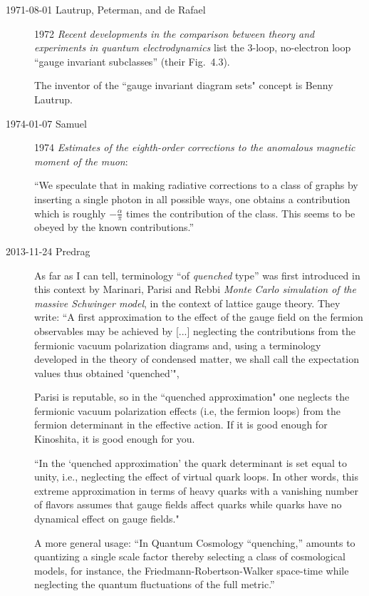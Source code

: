 \begin{description}
\item[1971-08-01 Lautrup, Peterman, and de Rafael]
 1972 {\em Recent
developments in the comparison between theory and experiments in quantum
electrodynamics} list the 3-loop, no-electron loop ``gauge invariant
subclasses'' (their Fig.~4.3).

The inventor of the ``gauge invariant diagram sets" concept is Benny
Lautrup.

\item[1974-01-07 Samuel]
1974 {\em Estimates of the eighth-order corrections
to the anomalous magnetic moment of the muon}:

``We speculate that in making radiative corrections to a class of graphs
by inserting a single photon in all possible ways, one obtains a
contribution which is roughly $-\frac{\alpha}{\pi}$ times the
contribution of the class. This seems to be obeyed by the known
contributions.''

\item[2013-11-24  Predrag]
As far as I can tell, terminology ``of \emph{quenched} type'' was first
introduced in this context by
Marinari, Parisi and Rebbi
{\em {Monte Carlo} simulation of the massive {Schwinger} model},
in the context of lattice gauge theory. They write:
``A first approximation to the effect of the gauge field on the fermion
observables may be achieved by [...] neglecting the contributions from
the fermionic vacuum polarization diagrams and, using a terminology
developed in the theory of condensed matter, we shall call the
expectation values thus obtained `quenched'",

Parisi is reputable, so in the ``quenched approximation" one neglects
the fermionic vacuum polarization effects (i.e, the fermion loops) from
the fermion determinant in the effective action. If it is good enough for Kinoshita,
it is good enough for you.

``In the `quenched approximation' the quark determinant is set equal to
unity, i.e., neglecting the effect of virtual quark loops. In
other words, this extreme approximation in terms of heavy quarks with a
vanishing number of flavors assumes that gauge fields affect quarks while
quarks have no dynamical effect on gauge fields."

A more general usage: ``In Quantum Cosmology ``quenching,'' amounts to
quantizing a single scale factor thereby selecting a class of
cosmological models, for instance, the Friedmann-Robertson-Walker
space-time while neglecting the quantum fluctuations of the full
metric.''


\end{description}
